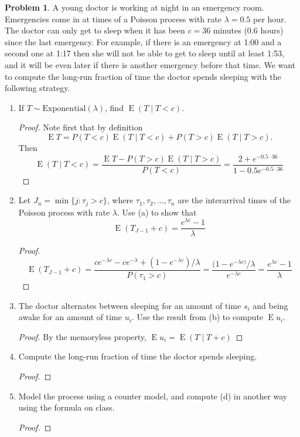 \documentclass[oneside]{amsart}
\DeclareMathOperator{\E}{\mathrm{E}}
\newcommand{\Exp}{\mathrm{Exponential}}
\theoremstyle{definition}
\newtheorem{prob}{Problem}
\begin{document}
\begin{prob}
A young doctor is working at night in an emergency room. Emergencies come in at times of a Poisson process with rate $\lambda=0.5$ per hour. The doctor can only get to sleep when it has been $c = 36$ minutes (0.6 hours) since the last emergency. For example, if there is an emergency at 1:00 and a second one at 1:17 then she will not be able to get to sleep until at least 1:53, and it will be even later if there is another emergency before that time. We want to compute the long-run fraction of time the doctor spends sleeping with the following strategy.
\end{prob}

\begin{enumerate}[label=(\alph*)]
\item
If $T\sim \Exp(\lambda)$, find $\E(T\mid T<c)$.
\begin{proof}
Note first that by definition 
\[
	\E T = P(T<c) \E(T\mid T<c)  + P(T>c) \E(T\mid T>c).
\]
Then 
\[
	\E(T\mid T<c) = \frac{\E T - P(T>c) \E(T\mid T>c)}{P(T<c)} = \frac{2 + e^{-0.5\cdot 36}}{1-0.5e^{-0.5\cdot 36}}
\]
\end{proof}
\item
Let $J_n= \min\{j:\tau_j > c\}$, where $\tau_1,\tau_2,\dotsc,\tau_n$ are the interarrival times of the Poisson process with rate $\lambda$. Use (a) to show that 
\[
	\E(T_{J-1} + c) = \frac{e^{\lambda c} -1}{\lambda} 
\]
\begin{proof}
\[	
	\E(T_{J-1} + c) = \frac{ce^{-\lambda c} -ce^{-\lambda} + (1-e^{-\lambda c})/\lambda}{P(\tau_1 > c)} 
	= \frac{(1-e^{-\lambda c)}/\lambda}{e^{-\lambda c}} 
	= \frac{e^{\lambda c}-1}{\lambda}
\]
\end{proof}
\item
The doctor alternates between sleeping for an amount of time $s_i$ and being awake for an amount of time $u_i$. Use the result from (b) to compute $\E u_i$.
\begin{proof}
By the memoryless property, $\E u_i = \E(T\mid T+c)$
\end{proof}
\item
Compute the long-run fraction of time the doctor spends sleeping.
\begin{proof}

\end{proof}
\item
Model the process using a counter model, and compute (d) in another way using the formula on class.
\begin{proof}

\end{proof}
\end{enumerate}
\end{document}
